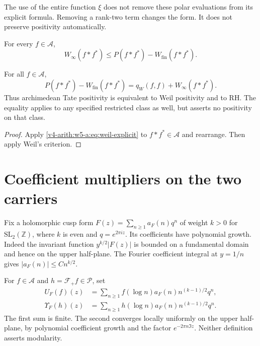 The use of the entire function $\xi$ does not remove these polar
evaluations from its explicit formula. Removing a rank-two term
changes the form. It does not preserve positivity automatically.

\begin{conjecture}
\label{v4-arith:w5-a:conj:archimedean-tate-positivity}
For every $f\in\mathscr A$,
\begin{equation}
 W_\infty(f*f^*)\le P(f*f^*)-W_{\mathrm{fin}}(f*f^*).
 \label{v4-arith:w5-a:eq:archimedean-tate-positivity}
\end{equation}
\end{conjecture}

\begin{theorem}
\label{v4-arith:w5-a:thm:ATP-equals-weil-positivity}
\label{v4-arith:w5-a:thm:HPLi-restricted}
For all $f\in\mathscr A$,
\begin{equation}
 P(f*f^*)-W_{\mathrm{fin}}(f*f^*)=q_W(f,f)+W_\infty(f*f^*).
 \label{v4-arith:w5-a:eq:restricted-HPLi}
\end{equation}
Thus archimedean Tate positivity is equivalent to Weil positivity
and to RH. The equality applies to any specified restricted class
as well, but asserts no positivity on that class.
\end{theorem}
\begin{proof}
Apply \eqref{v4-arith:w5-a:eq:weil-explicit} to $f*f^*\in\mathscr A$
and rearrange. Then apply Weil's criterion.
\end{proof}

\section{Coefficient multipliers on the two carriers}
\label{v4-arith:w5-a:mellin-lift}

Fix a holomorphic cusp form $F(z)=\sum_{n\ge1}a_F(n)q^n$ of weight
$k>0$ for $\mathrm{SL}_2(\mathbb Z)$, where $k$ is even and $q=e^{2\pi iz}$.
Its coefficients have polynomial growth. Indeed the invariant
function $y^{k/2}|F(z)|$ is bounded on a fundamental domain and
hence on the upper half-plane. The Fourier coefficient integral
at $y=1/n$ gives $|a_F(n)|\le C n^{k/2}$.

\begin{definition}
\label{v4-arith:w5-a:def:upsilon}
For $f\in\mathscr A$ and $h=\mathcal F_+f\in\mathscr P$, set
\begin{equation}
 \begin{aligned}
 U_F(f)(z)&=\sum_{n\ge1}f(\log n)a_F(n)n^{(k-1)/2}q^n,\\
 \Upsilon_F(h)(z)&=\sum_{n\ge1}h(\log n)a_F(n)n^{(k-1)/2}q^n.
 \end{aligned}
 \label{v4-arith:w5-a:eq:upsilon}
\end{equation}
The first sum is finite. The second converges locally uniformly
on the upper half-plane, by polynomial coefficient growth and
the factor $e^{-2\pi n\Im z}$.
Neither definition asserts modularity.
\end{definition}

